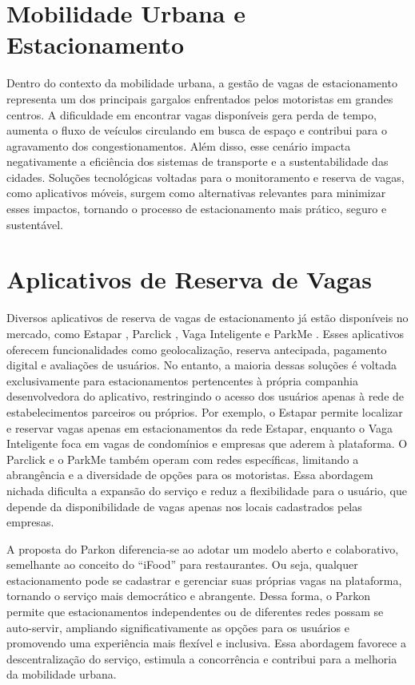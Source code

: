 \section{Mobilidade Urbana e Estacionamento}
\label{sec:mobilidade-estacionamento}

Dentro do contexto da mobilidade urbana, a gestão de vagas de estacionamento representa um dos principais gargalos enfrentados pelos motoristas em grandes centros. A dificuldade em encontrar vagas disponíveis gera perda de tempo, aumenta o fluxo de veículos circulando em busca de espaço e contribui para o agravamento dos congestionamentos. Além disso, esse cenário impacta negativamente a eficiência dos sistemas de transporte e a sustentabilidade das cidades. Soluções tecnológicas voltadas para o monitoramento e reserva de vagas, como aplicativos móveis, surgem como alternativas relevantes para minimizar esses impactos, tornando o processo de estacionamento mais prático, seguro e sustentável.


\section{Aplicativos de Reserva de Vagas}
\label{sec:aplicativos-reserva}

Diversos aplicativos de reserva de vagas \cite{antonio2025} de estacionamento já estão disponíveis no mercado, como Estapar \cite{estapar2025}, Parclick \cite{parclick2025}, Vaga Inteligente \cite{vagainteligente2025} e ParkMe \cite{parkme2025}. Esses aplicativos oferecem funcionalidades como geolocalização, reserva antecipada, pagamento digital e avaliações de usuários. No entanto, a maioria dessas soluções é voltada exclusivamente para estacionamentos pertencentes à própria companhia desenvolvedora do aplicativo, restringindo o acesso dos usuários apenas à rede de estabelecimentos parceiros ou próprios. Por exemplo, o Estapar permite localizar e reservar vagas apenas em estacionamentos da rede Estapar, enquanto o Vaga Inteligente foca em vagas de condomínios e empresas que aderem à plataforma. O Parclick e o ParkMe também operam com redes específicas, limitando a abrangência e a diversidade de opções para os motoristas. Essa abordagem nichada dificulta a expansão do serviço e reduz a flexibilidade para o usuário, que depende da disponibilidade de vagas apenas nos locais cadastrados pelas empresas.

A proposta do Parkon diferencia-se ao adotar um modelo aberto e colaborativo, semelhante ao conceito do ``iFood'' para restaurantes. Ou seja, qualquer estacionamento pode se cadastrar e gerenciar suas próprias vagas na plataforma, tornando o serviço mais democrático e abrangente. Dessa forma, o Parkon permite que estacionamentos independentes ou de diferentes redes possam se auto-servir, ampliando significativamente as opções para os usuários e promovendo uma experiência mais flexível e inclusiva. Essa abordagem favorece a descentralização do serviço, estimula a concorrência e contribui para a melhoria da mobilidade urbana.


